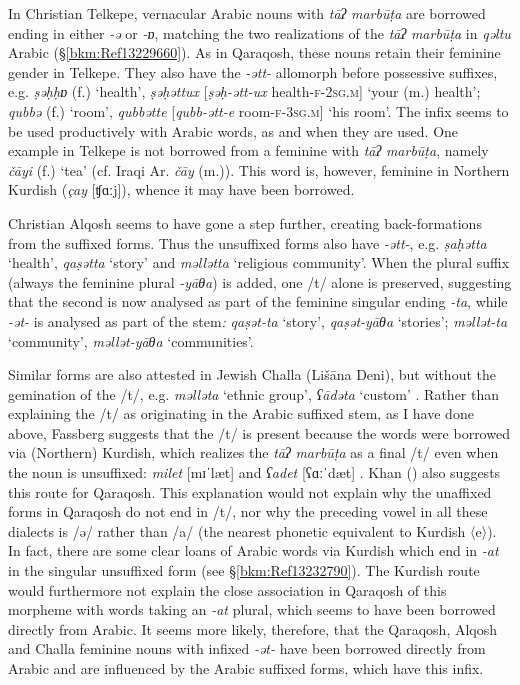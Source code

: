 \documentclass[output=paper]{langsci/langscibook}
\begin{document}
In Christian Telkepe, vernacular Arabic nouns with \textit{tāʔ} \textit{marbūṭa} are borrowed ending in either \textit{\nobreakdash-ə} or \textit{\nobreakdash-ɒ}, matching the two realizations of the \textit{tāʔ} \textit{marbūṭa} in \textit{qəltu} Arabic (§\ref{bkm:Ref13229660}). As in Qaraqosh, these nouns retain their feminine gender in Telkepe. They also have the \textit{\nobreakdash-ətt-} allomorph before possessive suffixes, e.g. \textit{ṣəḥḥɒ} (f.) ‘health’,  \textit{ṣəḥəttux} [\textit{ṣəḥ-ətt-ux} health-\textsc{f-2sg.m}] ‘your (m.) health’; \textit{qubbə} (f.) ‘room’, \textit{qubbətte} [\textit{qubb-ətt-e} room-\textsc{f-3sg.m}] ‘his room’. The infix seems to be used productively with Arabic words, as and when they are used. One example in Telkepe is not borrowed from a feminine with \textit{tāʔ} \textit{marbūṭa}, namely \textit{čāyi} (f.) ‘tea’ (cf. Iraqi Ar. \textit{čāy} (m.)). This word is, however, feminine in Northern Kurdish (\textit{çay} [ʧɑːj]), whence it may have been borrowed.

Christian Alqosh seems to have gone a step further, creating back-formations from the suffixed forms. Thus the unsuffixed forms also have \textit{{}-ətt-}, e.g. \textit{ṣaḥətta} ‘health’, \textit{qaṣətta} ‘story’ and \textit{məllətta} ‘religious community’. When the plural suffix (always the feminine plural \textit{\nobreakdash-yāθa}) is added, one /t/ alone is preserved, suggesting that the second is now analysed as part of the feminine singular ending \textit{\nobreakdash-ta}, while \textit{\nobreakdash-ət\nobreakdash-} is analysed as part of the stem\textit{:} \textit{qaṣət\nobreakdash-ta} ‘story’, \textit{qaṣət\nobreakdash-yāθa} ‘stories’; \textit{məllət\nobreakdash-ta} ‘community’, \textit{məllət\nobreakdash-yāθa} ‘communities’.

Similar forms are also attested in Jewish Challa (Lišāna Deni), but without the gemination of the /t/, e.g. \textit{məlləta} ‘ethnic group’, \textit{ʕādəta} ‘custom’ \citep[52]{Fassberg2010}. Rather than explaining the /t/ as originating in the Arabic suffixed stem, as I have done above, Fassberg suggests that the /t/ is present because the words were borrowed via (Northern) Kurdish, which realizes the \textit{tāʔ} \textit{marbūṭa} as a final /t/ even when the noun is unsuffixed: \textit{milet} [mɪˈlæt] and \textit{ʕadet} [ʕɑːˈdæt] \citep[387]{Chyet2003}. Khan (\citeyear[206]{Khan2002}) also suggests this route for Qaraqosh. This explanation would not explain why the unaffixed forms in Qaraqosh do not end in /t/, nor why the preceding vowel in all these dialects is /ə/ rather than /a/ (the nearest phonetic equivalent to Kurdish 〈e〉). In fact, there are some clear loans of Arabic words via Kurdish which end in \textit{{}-at} in the singular unsuffixed form (see §\ref{bkm:Ref13232790}). The Kurdish route would furthermore not explain the close association in Qaraqosh of this morpheme with words taking an \textit{\nobreakdash-at} plural, which seems to have been borrowed directly from Arabic. It seems more likely, therefore, that the Qaraqosh, Alqosh and Challa feminine nouns with infixed \textit{\nobreakdash-ət\nobreakdash-} have been borrowed directly from Arabic and are influenced by the Arabic suffixed forms, which have this infix.
\end{document}
